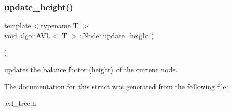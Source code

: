 \subsubsection{\texorpdfstring{update\+\_\+height()}{update\_height()}}
{\footnotesize\ttfamily template$<$typename T $>$ \\
void \hyperlink{classalgo_1_1_a_v_l}{algo\+::\+A\+VL}$<$ T $>$\+::Node\+::update\+\_\+height (\begin{DoxyParamCaption}{ }\end{DoxyParamCaption})\hspace{0.3cm}{\ttfamily [inline]}}

updates the balance factor (height) of the current node. 

The documentation for this struct was generated from the following file\+:\begin{DoxyCompactItemize}
\item 
avl\+\_\+tree.\+h\end{DoxyCompactItemize}
